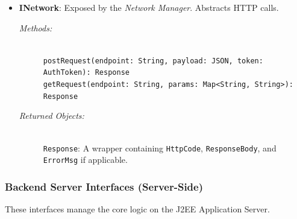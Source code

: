 \begin{itemize}
    \item \begin{minipage}[t]{\linewidth}
        \textbf{INetwork}: Exposed by the \textit{Network Manager}. Abstracts HTTP calls.
        \begin{description}
            \item[\textit{Methods:}] \hfill \\
            \texttt{postRequest(endpoint: String, payload: JSON, token: AuthToken): Response} \\
            \texttt{getRequest(endpoint: String, params: Map<String, String>): Response}
            \item[\textit{Returned Objects:}] \hfill \\
            \texttt{Response}: A wrapper containing \texttt{HttpCode}, \texttt{ResponseBody}, and \texttt{ErrorMsg} if applicable.
        \end{description}
    \end{minipage}
\end{itemize}

\clearpage
\subsubsection{Backend Server Interfaces (Server-Side)}
These interfaces manage the core logic on the J2EE Application Server.

